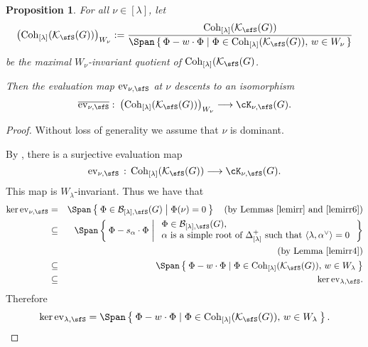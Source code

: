 \documentclass[12pt,a4paper]{amsart}
\newcommand{\CK}{{\mathcal {K}}}
\newcommand{\la}{\langle}
\newcommand{\ra}{\rangle}
\numberwithin{equation}{section}
\newtheorem{prop}[thm]{Proposition}
\theoremstyle{remark}
\def\Coh{\mathrm{Coh}}
\def\ev#1{{\mathrm{ev}_{#1}}}
\newcommand{\Lam}{{[\lambda]}}
\newcommand{\Grt}{\cK}
\begin{document}
\begin{prop}\label{prop:ev}
  For all $\nu\in [\lambda]$, let
  \[
    \left(\Coh_{[\lambda]}(\CK_\sfS(G))\right)_{W_{\nu}}:= \frac{\Coh_{[\lambda]}(\CK_\sfS(G))}
    {\Span\set{\Phi- w\cdot \Phi \mid \Phi\in \Coh_{[\lambda]}(\CK_\sfS(G)), \, w\in W_{\nu}}}
  \]
  be the maximal $W_{\nu}$-invariant quotient of $\Coh_{[\lambda]}(\CK_\sfS(G)$.

  Then the evaluation map $\ev{\nu,\sfS}$ at $\nu$
  descents to an isomorphism
  \[
    \overline{\ev{\nu , \sfS}} \, \colon \left(\Coh_{[\lambda]}(\CK_\sfS(G))\right)_{W_{\nu}} \longrightarrow \Grt_{\nu, \sfS}(G).
  \]
\end{prop}
\begin{proof}
Without loss of generality we assume that $\nu$ is dominant.

By , there is a surjective evaluation  map
  \[
    \ev{\nu, \sfS} \, :\, \Coh_{[\lambda]}(\CK_\sfS(G)) \longrightarrow \Grt_{\nu, \sfS}(G).
  \]
  This map is $W_\lambda$-invariant. Thus we have that
  \begin{eqnarray*}
      \ker \ev{\nu, \sfS}& = & \Span \Set{\Phi\in \mathcal B_{\Lam,\sfS}(G) | \Phi (\nu)=0}\quad \textrm{(by Lemmas \ref{lemirr} and \ref{lemirr6}})\\
                         &  \subseteq & \Span \Set{\Phi - s_{\alpha}\cdot\Phi |
                                        \begin{array}{l} \Phi\in  \mathcal B_{\Lam,\sfS}(G),\\
                                          \alpha  \text{ is a simple root of
                                          $\Delta_{\Lam}^+$ such that
                                          }\la \lambda, \alpha^\vee\ra=0
                                        \end{array}}\\
                         &&\hspace{5em}    \qquad  \textrm{(by Lemma \ref{lemirr4})} \\
           & \subseteq &\Span\Set{\Phi- w\cdot \Phi \mid \Phi\in \Coh_{[\lambda]}(\CK_\sfS(G)), \, w\in W_{\lambda}} \\
    &  \subseteq &  \ker \ev{\lambda, \sfS}. \\
        \end{eqnarray*}
Therefore
\[
 \ker \ev{\lambda, \sfS}=\Span\Set{\Phi- w \cdot\Phi \mid \Phi\in  \Coh_{[\lambda]}(\CK_\sfS(G)), \, w\in W_{\lambda}}.
\]
\end{proof}
\end{document}
